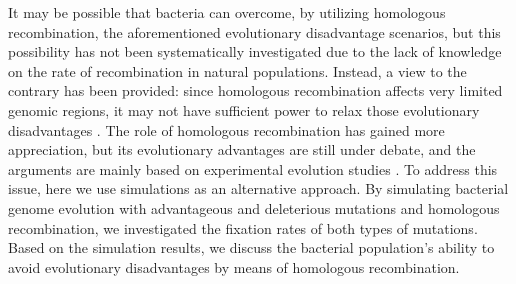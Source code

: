 \documentclass[twoside,twocolumn, letterpaper]{article}
\begin{document}
It may be possible that bacteria can overcome, by utilizing homologous recombination, the aforementioned evolutionary disadvantage scenarios, but this possibility has not been systematically investigated due to the lack of knowledge on the rate of recombination in natural populations. Instead, a view to the contrary has been provided:
 since homologous recombination affects very limited genomic regions, it may not have sufficient power to relax those evolutionary disadvantages \cite[]{MaynardSmith_1991_1985260}. The role of homologous recombination  has gained more appreciation, 
 but its evolutionary advantages are still under debate, and the arguments are mainly based on experimental evolution studies \cite[]{Souza_1997_64,Cooper_2007_17713986,Bacher_2006_17028281,Baltrus_2008_17976191}. 
To address this issue, here we use simulations as an alternative approach. By simulating bacterial genome evolution with advantageous and deleterious mutations and homologous recombination, we investigated the fixation rates of both types of mutations. Based on the 
simulation results,  we discuss the bacterial population's ability to avoid evolutionary disadvantages by means of homologous recombination.







\end{document}
